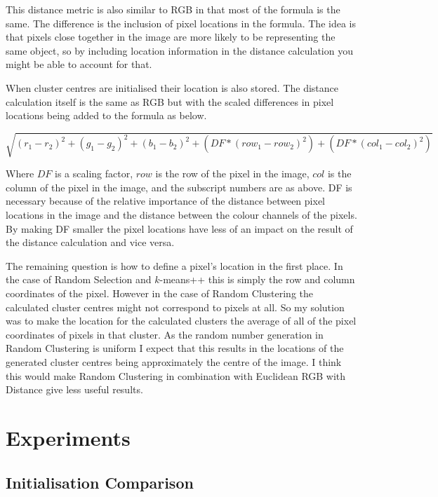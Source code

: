 \documentclass{article}
\begin{document}
This distance metric is also similar to RGB in that most of the formula is the same. The difference is the inclusion of pixel locations in the formula. The idea is that pixels close together in the image are more likely to be representing the same object, so by including location information in the distance calculation you might be able to account for that. 

When cluster centres are initialised their location is also stored. The distance calculation itself is the same as RGB but with the scaled differences in pixel locations being added to the formula as below.

\begin{equation*}
 \sqrt{(r_1-r_2)^2 + (g_1-g_2)^2 + (b_1-b_2)^2 + (DF*(row_1-row_2)^2) + (DF*(col_1-col_2)^2)}	
\end{equation*}


Where $DF$ is a scaling factor, $row$ is the row of the pixel in the image, $col$ is the column of the pixel in the image, and the subscript numbers are as above.
DF is necessary because of the relative importance of the distance between pixel locations in the image and the distance between the colour channels of the pixels. By making DF smaller the pixel locations have less of an impact on the result of the distance calculation and vice versa. 

The remaining question is how to define a pixel's location in the first place.
In the case of Random Selection and $k$-means++ this is simply the row and column coordinates of the pixel. However in the case of Random Clustering the calculated cluster centres might not correspond to pixels at all. So my solution was to make the location for the calculated clusters the average of all of the pixel coordinates of pixels in that cluster. As the random number generation in Random Clustering is uniform I expect that this results in the locations of the generated cluster centres being approximately the centre of the image. I think this would make Random Clustering in combination with Euclidean RGB with Distance give less useful results. 

\section{Experiments}

\subsection{Initialisation Comparison}
\end{document}
